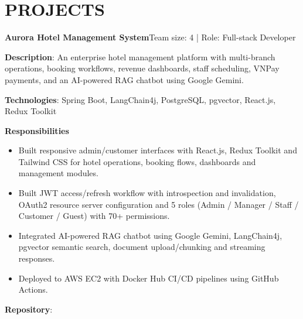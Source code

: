 \section{PROJECTS}
\resumeSubHeadingListStart

  \resumeProjectHeading
    {\textbf{Aurora Hotel Management System}}{Team size: 4 | Role: Full-stack Developer}
    \resumeItemListStart
      \item \textbf{Description}: An enterprise hotel management platform with multi-branch operations, booking workflows,
        revenue dashboards, staff scheduling, VNPay payments, and an AI-powered RAG chatbot using Google Gemini.
      \item \textbf{Technologies}: Spring Boot, LangChain4j, PostgreSQL, pgvector, React.js, Redux Toolkit
      \item \textbf{Responsibilities}
        \begin{itemize}
          \item Built responsive admin/customer interfaces with React.js, Redux Toolkit and Tailwind CSS for hotel operations, booking flows, dashboards and management modules.
          \item Built JWT access/refresh workflow with introspection and invalidation, OAuth2 resource server configuration and 5 roles (Admin / Manager / Staff / Customer / Guest) with 70+ permissions.
          \item Integrated AI-powered RAG chatbot using Google Gemini, LangChain4j, pgvector semantic search, document upload/chunking and streaming responses.
          \item Deployed to AWS EC2 with Docker Hub CI/CD pipelines using GitHub Actions.
        \end{itemize}
      \item \textbf{Repository}: \href{https://github.com/nvminh162/aurora-hotel-management-system}{}
    \resumeItemListEnd

